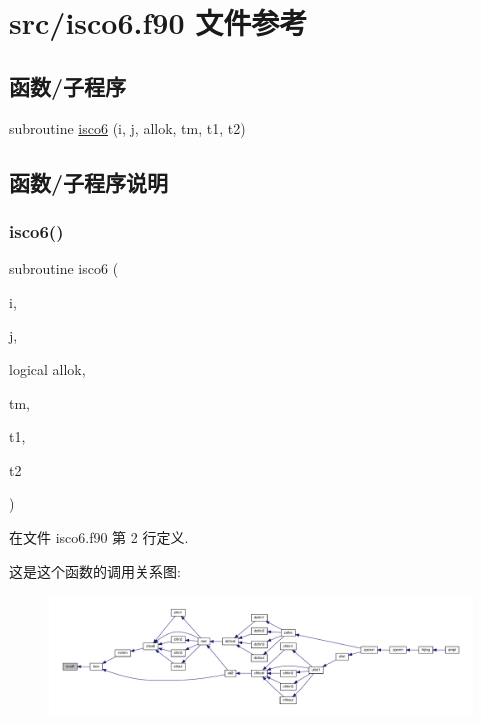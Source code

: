 \hypertarget{isco6_8f90}{}\section{src/isco6.f90 文件参考}
\label{isco6_8f90}
\subsection*{函数/子程序}
\begin{DoxyCompactItemize}
\item 
subroutine \mbox{\hyperlink{isco6_8f90_abc784a1386116be238d2bfcca22d732a}{isco6}} (i, j, allok, tm, t1, t2)
\end{DoxyCompactItemize}


\subsection{函数/子程序说明}
\mbox{\label{isco6_8f90_abc784a1386116be238d2bfcca22d732a}} 
\subsubsection{\texorpdfstring{isco6()}{isco6()}}
{\footnotesize\ttfamily subroutine isco6 (\begin{DoxyParamCaption}\item[{}]{i,  }\item[{}]{j,  }\item[{logical}]{allok,  }\item[{}]{tm,  }\item[{}]{t1,  }\item[{}]{t2 }\end{DoxyParamCaption})}



在文件 isco6.\+f90 第 2 行定义.

这是这个函数的调用关系图\+:
\nopagebreak
\begin{figure}[H]
\begin{center}
\leavevmode
\includegraphics[width=350pt]{isco6_8f90_abc784a1386116be238d2bfcca22d732a_icgraph}
\end{center}
\end{figure}
